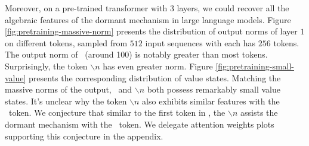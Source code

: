 Moreover, on a pre-trained transformer with $3$ layers, we could recover all the algebraic features of the dormant mechanism in large language models. Figure \ref{fig:pretraining-massive-norm} presents the distribution of output norms of layer $1$ on different tokens, sampled from $512$ input sequences with each has $256$ tokens. The output norm of \bos~(around 100) is notably greater than most tokens. Surprisingly, the token $\backslash n$ has even greater norm. Figure \ref{fig:pretraining-small-value} presents the corresponding distribution of value states. Matching the massive norms of the output, \bos~and $\backslash n$ both possess remarkably small value states. It's unclear why the token $\backslash n$ also exhibits similar features with the \bos~token. We conjecture that similar to the first \delim token in \llama, the $\backslash n$ assists the dormant mechanism with the \bos~token. We delegate attention weights plots supporting this conjecture in the appendix.

